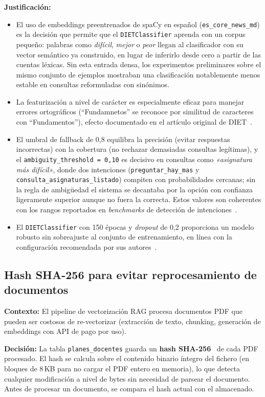 \textbf{Justificación:}
\begin{itemize}
    \item El uso de embeddings preentrenados de spaCy en español (\texttt{es\_core\_news\_md}) es la decisión que permite que el \texttt{DIETClassifier} aprenda con un corpus pequeño: palabras como \textit{difícil}, \textit{mejor} o \textit{peor} llegan al clasificador con su vector semántico ya construido, en lugar de inferirlo desde cero a partir de las cuentas léxicas. Sin esta entrada densa, los experimentos preliminares sobre el mismo conjunto de ejemplos mostraban una clasificación notablemente menos estable en consultas reformuladas con sinónimos.
    \item La featurización a nivel de carácter es especialmente eficaz para manejar errores ortográficos (``Fundamnetos'' se reconoce por similitud de caracteres con ``Fundamentos''), efecto documentado en el artículo original de DIET~\cite{bocklisch2020diet}.
    \item El umbral de fallback de 0,8 equilibra la precisión (evitar respuestas incorrectas) con la cobertura (no rechazar demasiadas consultas legítimas), y el \texttt{ambiguity\_threshold = 0,10} es decisivo en consultas como \textit{«asignatura más difícil»}, donde dos intenciones (\texttt{preguntar\_hay\_mas} y \texttt{consulta\_asignaturas\_listado}) compiten con probabilidades cercanas; sin la regla de ambigüedad el sistema se decantaba por la opción con confianza ligeramente superior aunque no fuera la correcta. Estos valores son coherentes con los rangos reportados en \textit{benchmarks} de detección de intenciones~\cite{casanueva2020efficient}.
    \item El \texttt{DIETClassifier} con 150 épocas y \textit{dropout} de 0,2 proporciona un modelo robusto sin sobreajuste al conjunto de entrenamiento, en línea con la configuración recomendada por sus autores~\cite{bocklisch2020diet}.
\end{itemize}

\subsection{Hash SHA-256 para evitar reprocesamiento de documentos}\label{subsec:dd-hash}

\textbf{Contexto:} El pipeline de vectorización RAG procesa documentos PDF que pueden ser costosos de re-vectorizar (extracción de texto, chunking, generación de embeddings con API de pago por uso).

\textbf{Decisión:} La tabla \texttt{planes\_docentes} guarda un \textbf{hash SHA-256}~\cite{nistFips180} de cada PDF procesado. El hash se calcula sobre el contenido binario íntegro del fichero (en bloques de 8\,KB para no cargar el PDF entero en memoria), lo que detecta cualquier modificación a nivel de bytes sin necesidad de parsear el documento. Antes de procesar un documento, se compara el hash actual con el almacenado.

